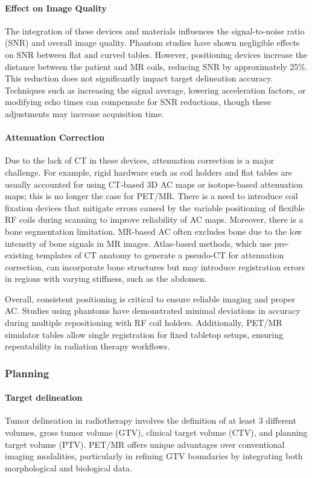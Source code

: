 \documentclass[11pt]{article} %
\begin{document}
\begin{multicols}{2}
\paragraph{Effect on Image Quality}
The integration of these devices and materials influences the signal-to-noise ratio (SNR) and overall image quality. Phantom studies have shown negligible effects on SNR between flat and curved tables. However, positioning devices increase the distance between the patient and MR coils, reducing SNR by approximately 25\%. This reduction does not significantly impact target delineation accuracy. Techniques such as increasing the signal average, lowering acceleration factors, or modifying echo times can compensate for SNR reductions, though these adjustments may increase acquisition time.

\paragraph{Attenuation Correction}
Due to the lack of CT in these devices, attenuation correction is a major challenge. For example, rigid hardware such as coil holders and flat tables are usually accounted for using CT-based 3D AC maps or isotope-based attenuation maps; this is no longer the case for PET/MR. There is a need to introduce coil fixation devices that mitigate errors caused by the variable positioning of flexible RF coils during scanning to improve reliability of AC maps. Moreover, there is a bone segmentation limitation. MR-based AC often excludes bone due to the low intensity of bone signals in MR images. Atlas-based methods, which use pre-existing templates of CT anatomy to generate a pseudo-CT for attenuation correction, can incorporate bone structures but may introduce registration errors in regions with varying stiffness, such as the abdomen.

Overall, consistent positioning is critical to ensure reliable imaging and proper AC. Studies using phantoms have demonstrated minimal deviations in accuracy during multiple repositioning with RF coil holders. Additionally, PET/MR simulator tables allow single registration for fixed tabletop setups, ensuring repeatability in radiation therapy workflows.

\subsubsection{Planning}

\paragraph{Target delineation}
Tumor delineation in radiotherapy involves the definition of at least 3 different volumes, gross tumor volume (GTV), clinical target volume (CTV), and planning target volume (PTV). PET/MR offers unique advantages over conventional imaging modalities, particularly in refining GTV boundaries by integrating both morphological and biological data.



\end{multicols}
\end{document}
